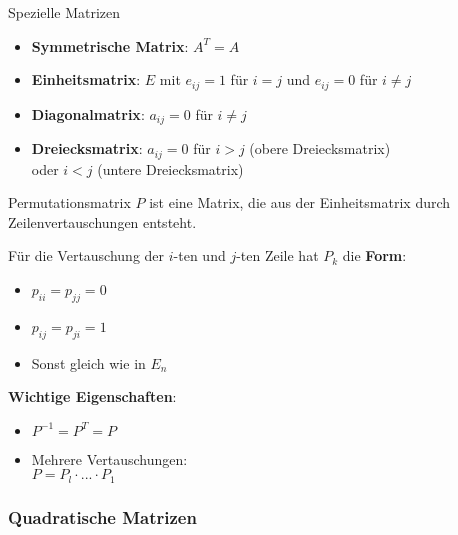     \begin{KR}{Spezielle Matrizen}
        \begin{itemize}
            \item \textbf{Symmetrische Matrix}: $A^T = A$
            \item \textbf{Einheitsmatrix}: $E$ mit $e_{ij} = 1$ für $i = j$ und $e_{ij} = 0$ für $i \neq j$
            \item \textbf{Diagonalmatrix}: $a_{ij} = 0$ für $i \neq j$
            \item \textbf{Dreiecksmatrix}: $a_{ij} = 0$ für $i > j$ (obere Dreiecksmatrix) \\oder $i < j$ (untere Dreiecksmatrix)
        \end{itemize}
    \end{KR}

  
\begin{concept}{Permutationsmatrix} $P$ ist eine Matrix, die aus der Einheitsmatrix durch Zeilenvertauschungen entsteht. 
    \vspace{1mm}\\
    \begin{minipage}[t]{0.5\textwidth}
        Für die Vertauschung der $i$-ten und $j$-ten Zeile hat $P_k$ die \textbf{Form}:
        \begin{itemize}
            \item $p_{ii} = p_{jj} = 0$ 
            \item $p_{ij} = p_{ji} = 1$
            \item Sonst gleich wie in $E_n$
        \end{itemize}
    \end{minipage}
    \hspace{3mm}
    \begin{minipage}[t]{0.45\textwidth}
        \vspace{1mm}
        \textbf{Wichtige Eigenschaften}:
        \begin{itemize}
            \item $P^{-1} = P^T = P$
            \item Mehrere Vertauschungen:\\ $P = P_l \cdot ... \cdot P_1$
        \end{itemize}
    \end{minipage}
\end{concept}

\subsubsection{Quadratische Matrizen}
  
